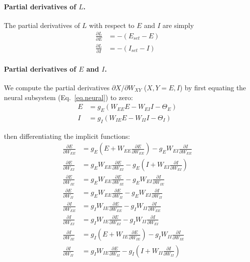 \documentclass[twocolumn]{article}
\newcommand{\EE}{\mathit{EE}}
\newcommand{\EI}{\mathit{EI}}
\newcommand{\IE}{\mathit{IE}}
\newcommand{\II}{\mathit{II}}
\newcommand{\XY}{\mathit{XY}}
\newcommand{\set}{\mathit{set}}
\begin{document}
\paragraph{Partial derivatives of $L$.}

The partial derivatives of $L$ with respect to $E$ and $I$ are simply
\begin{equation}
\begin{aligned}
\frac{\partial L}{\partial E} & = - (E_{\set} - E) \\
\frac{\partial L}{\partial I} & = - (I_{\set} - I)
\end{aligned}
\label{eq.LF_dLdEI}
\end{equation}



\paragraph{Partial derivatives of $E$ and $I$.}

We compute the partial derivatives $\partial X/\partial W_{\XY}$ ($X,Y = E,I$) by first equating the neural subsystem (Eq.\ \ref{eq.neural}) to zero:
\begin{equation}
\begin{aligned}
E & = g_E(W_{\EE}E - W_{\EI}I - \Theta_E) \\
I & = g_I(W_{\IE}E - W_{\II}I - \Theta_I)
\end{aligned}
\label{eq.LF_implicit_functions}
\end{equation}

\noindent then differentiating the implicit functions:
\begin{equation}
\begin{aligned}
\frac{\partial E}{\partial W_{\EE}} & = g_E(E + W_{\EE} \frac{\partial E}{\partial W_{\EE}}) - g_E W_{\EI} \frac{\partial I}{\partial W_{\EE}} \\
\frac{\partial E}{\partial W_{\EI}} & = g_E W_{\EE} \frac{\partial E}{\partial W_{\EI}} - g_E (I + W_{\EI} \frac{\partial I}{\partial W_{\EI}}) \\
\frac{\partial E}{\partial W_{\IE}} & = g_E W_{\EE} \frac{\partial E}{\partial W_{\IE}} - g_E W_{\EI}\frac{\partial I}{\partial W_{\IE}} \\
\frac{\partial E}{\partial W_{\II}} & = g_E W_{\EE} \frac{\partial E}{\partial W_{\II}} - g_E W_{\EI} \frac{\partial I}{\partial W_{\II}} \\
\frac{\partial I}{\partial W_{\EE}} & = g_I W_{\IE} \frac{\partial E}{\partial W_{\EE}} - g_I W_{\II} \frac{\partial I}{\partial W_{\EE}} \\
\frac{\partial I}{\partial W_{\EI}} & = g_I W_{\IE} \frac{\partial E}{\partial W_{\EI}} - g_I W_{\II} \frac{\partial I}{\partial W_{\EI}} \\
\frac{\partial I}{\partial W_{\IE}} & = g_I (E + W_{\IE} \frac{\partial E}{\partial W_{\IE}}) - g_I W_{\II} \frac{\partial I}{\partial W_{\IE}} \\
\frac{\partial I}{\partial W_{\II}} & = g_I W_{\IE} \frac{\partial E}{\partial W_{\II}} - g_I (I + W_{\II} \frac{\partial I}{\partial W_{\II}})
\end{aligned}
\label{eq.LF_implicit_derivs}
\end{equation}
\end{document}
